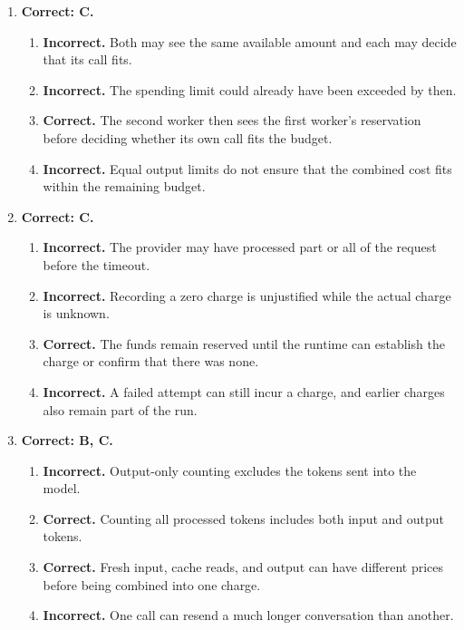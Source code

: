 \begin{enumerate}[start=51,itemsep=0.7\baselineskip]
\item[{\hyperref[exercise:54]{54.}}] \begin{minipage}[t]{\linewidth}
\textbf{Correct: C.}
\begin{enumerate}[label=\textnormal{(\Alph*)},leftmargin=*,itemsep=0pt]
\item \textbf{Incorrect.} Both may see the same available amount and each may decide that its call fits.
\item \textbf{Incorrect.} The spending limit could already have been exceeded by then.
\item \textbf{Correct.} The second worker then sees the first worker's reservation before deciding whether its own call fits the budget.
\item \textbf{Incorrect.} Equal output limits do not ensure that the combined cost fits within the remaining budget.
\end{enumerate}
\end{minipage}

\item[{\hyperref[exercise:55]{55.}}] \begin{minipage}[t]{\linewidth}
\textbf{Correct: C.}
\begin{enumerate}[label=\textnormal{(\Alph*)},leftmargin=*,itemsep=0pt]
\item \textbf{Incorrect.} The provider may have processed part or all of the request before the timeout.
\item \textbf{Incorrect.} Recording a zero charge is unjustified while the actual charge is unknown.
\item \textbf{Correct.} The funds remain reserved until the runtime can establish the charge or confirm that there was none.
\item \textbf{Incorrect.} A failed attempt can still incur a charge, and earlier charges also remain part of the run.
\end{enumerate}
\end{minipage}

\item[{\hyperref[exercise:56]{56.}}] \begin{minipage}[t]{\linewidth}
\textbf{Correct: B, C.}
\begin{enumerate}[label=\textnormal{(\Alph*)},leftmargin=*,itemsep=0pt]
\item \textbf{Incorrect.} Output-only counting excludes the tokens sent into the model.
\item \textbf{Correct.} Counting all processed tokens includes both input and output tokens.
\item \textbf{Correct.} Fresh input, cache reads, and output can have different prices before being combined into one charge.
\item \textbf{Incorrect.} One call can resend a much longer conversation than another.
\end{enumerate}
\end{minipage}


\end{enumerate}
